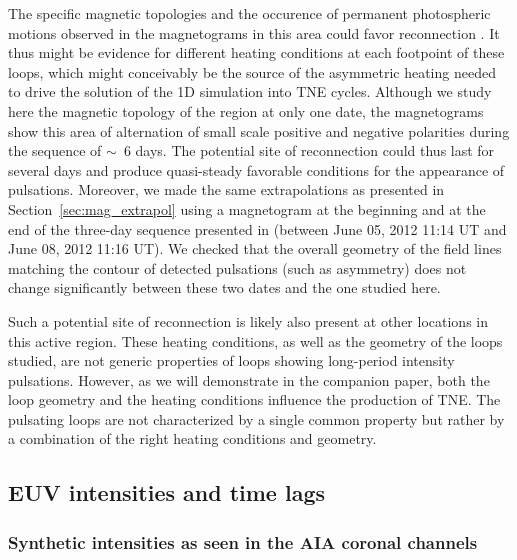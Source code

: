 \documentclass[preprint2]{aastex6}
\begin{document}
The specific magnetic topologies and the occurence of permanent photospheric motions observed in the magnetograms in this area could favor reconnection \citep[e.g.,][]{billinghurst_current-sheet_1993,pariat_current_2009}.
It thus might be evidence for different heating conditions at each footpoint of these loops, which might conceivably be the source of the asymmetric heating needed to drive the solution of the 1D simulation into TNE cycles.
Although we study here the magnetic topology of the region at only one date, the magnetograms show this area of alternation of small scale positive and negative polarities during the sequence of $\sim$~6 days. The potential site of reconnection could thus last for several days and produce quasi-steady favorable conditions for the appearance of pulsations. Moreover, we made the same extrapolations as presented in Section~\ref{sec:mag_extrapol} using a magnetogram at the beginning and at the end of the three-day sequence presented in \citet{froment2015} (between June 05, 2012 11:14 UT and June 08, 2012 11:16 UT). We checked that the overall geometry of the field lines matching the contour of detected pulsations (such as asymmetry) does not change significantly between these two dates and the one studied here.

Such a potential site of reconnection is likely also present at other locations in this active region. These heating conditions, as well as the geometry of the loops studied, are not generic properties of loops showing long-period intensity pulsations. However, as we will demonstrate in the companion paper, both the loop geometry and the heating conditions influence the production of TNE. The pulsating loops are not characterized by a single common property but rather by a combination of the right heating conditions and geometry.


\subsection{EUV intensities and time lags}\label{sec:intensity}
	
	\subsubsection{Synthetic intensities as seen in the AIA coronal channels}

	
\end{document}
